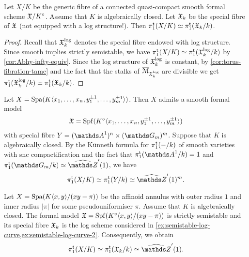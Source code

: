 \begin{lem}
    Let $X/K$ be the generic fibre of a connected quasi-compact smooth formal scheme ${\mathfrak{X}}/K^\circ$.  Assume that $K$ is algebraically closed. 
 Let ${\mathfrak{X}}_k$ be the special fibre of ${\mathfrak{X}}$ (not equipped with a log structure!). Then $\pi_1^{\mathrm{t}}(X/K) \simeq \pi_1^{\mathrm{t}}({\mathfrak{X}}_k/k)$.
\end{lem}

\begin{proof}
Recall that ${\mathfrak{X}}_k^{\log}$ denotes the special fibre endowed with log structure. Since smooth implies strictly semistable, we have $\pi_1^{\mathrm{t}}(X/K)\simeq \pi_1^{\mathrm{t}}({\mathfrak{X}}_k^{\log}/k)$ by \cref{cor:Abhy-infty-equiv}. Since the log structure of ${\mathfrak{X}}_k^{\log}$ is constant, by \cref{cor:torus-fibration-tame} and the fact that the stalks of $\overline{{\mathcal M}}_{{\mathfrak{X}}^{\log}_k}$ are divisible we get $\pi_1^{\mathrm{t}}({\mathfrak{X}}^{\log}_k/k) \simeq \pi_1^{\mathrm{t}}({\mathfrak{X}}_k/k)$. 
\end{proof} 

\begin{ex} \label{ex:polydisc}
    Let $X = \operatorname{Spa}(K\langle x_1, \dots, x_n, y_1^{\pm 1},\dots, y_m^{\pm 1}\rangle)$.   
Then $X$ admits a smooth formal model 
    \[
        {\mathfrak{X}} = \operatorname{Spf}(K^\circ\langle x_1, \dots, x_n, y_1^{\pm 1},\dots, y_m^{\pm 1}\rangle)
    \]
    with special fibre $Y = (\bA^1)^n\times(\mathbb{G}_m)^m$. Suppose that $K$ is algebraically closed. By the K\"unneth formula for $\pi_1^{\mathrm{t}}(-/k)$ of smooth varieties with snc compactification \cite[Thm. 5.1]{Orgogozo2003:AlterationsGroupeFondamental} and the fact that $\pitame(\bA^1/k)=1$ and $\pitame(\mathbb{G}_m/k)\simeq \widehat{\bZ}'(1)$, we have 
    \[ 
        \pitame(X/K) \simeq \pitame(Y/k)\simeq  \widehat{\bZ}'(1)^m. 
    \]
\end{ex}

\begin{ex}[Annulus]
    Let $X=\operatorname{Spa}(K\langle x, y\rangle/(xy-\pi))$ be the affinoid annulus with outer radius $1$ and inner radius $|\pi|$ for some pseudouniformiser $\pi$.  Assume that $K$ is algebraically closed. 
The formal model ${\mathfrak{X}} = \operatorname{Spf}(K^\circ\langle x,y\rangle/(xy-\pi))$ is strictly semistable and its special fibre ${\mathfrak{X}}_k$ is the log scheme considered in \cref{ex:semistable-log-curve,ex:semistable-log-curve-2}. Consequently, we obtain
    \[
        \pitame(X/K)\simeq \pitame(\fX_k/k)\simeq \widehat{\bZ}'(1).
    \]
\end{ex}

